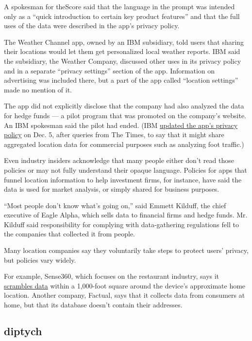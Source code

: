 A spokesman for theScore said that the language in the prompt was
intended only as a ``quick introduction to certain key product
features'' and that the full uses of the data were described in the
app's privacy policy.

The Weather Channel app, owned by an IBM subsidiary, told users that
sharing their locations would let them get personalized local weather
reports. IBM said the subsidiary, the Weather Company, discussed other
uses in its privacy policy and in a separate ``privacy settings''
section of the app. Information on advertising was included there, but a
part of the app called ``location settings'' made no mention of it.

The app did not explicitly disclose that the company had also analyzed
the data for hedge funds --- a pilot program that was promoted on the
company's website. An IBM spokesman said the pilot had ended. (IBM
\href{https://weather.com/en-US/twc/privacy-policy}{updated the app's
privacy policy} on Dec. 5, after queries from The Times, to say that it
might share aggregated location data for commercial purposes such as
analyzing foot traffic.)

Even industry insiders acknowledge that many people either don't read
those policies or may not fully understand their opaque language.
Policies for apps that funnel location information to help investment
firms, for instance, have said the data is used for market analysis, or
simply shared for business purposes.

``Most people don't know what's going on,'' said Emmett Kilduff, the
chief executive of Eagle Alpha, which sells data to financial firms and
hedge funds. Mr. Kilduff said responsibility for complying with
data-gathering regulations fell to the companies that collected it from
people.

Many location companies say they voluntarily take steps to protect
users' privacy, but policies vary widely.

For example, Sense360, which focuses on the restaurant industry, says it
\href{https://sense360.com/portfolio/additional-information-protect-user-privacy/}{scrambles
data} within a 1,000-foot square around the device's approximate home
location. Another company, Factual, says that it collects data from
consumers at home, but that its database doesn't contain their
addresses.

\hypertarget{diptych}{%
\subsection{diptych}\label{diptych}}

